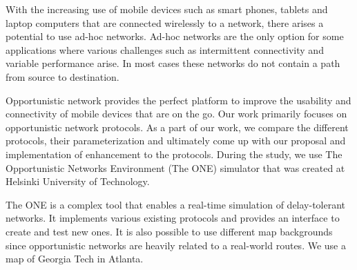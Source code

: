 \documentclass[conference]{IEEEtran}
\begin{document}
With the increasing use of mobile devices such as smart phones, tablets and laptop computers that are connected wirelessly to a network, there arises a potential to use ad-hoc networks. Ad-hoc networks are the only option for some applications where various challenges such as intermittent connectivity and variable performance arise. In most cases these networks do not contain a path from source to destination.

Opportunistic network provides the perfect platform to improve the usability and connectivity of mobile devices that are on the go. Our work primarily focuses on opportunistic network protocols. As a part of our work, we compare the different protocols, their parameterization and ultimately come up with our proposal and implementation of enhancement to the protocols. During the study, we use The Opportunistic Networks Environment (The ONE) simulator \cite{keranen-theone} that was created at Helsinki University of Technology.

The ONE is a complex tool that enables a real-time simulation of delay-tolerant networks. It implements various existing protocols and provides an interface to create and test new ones. It is also possible to use different map backgrounds since opportunistic networks are heavily related to a real-world routes. We use a map of Georgia Tech in Atlanta.

%
%

\end{document}
